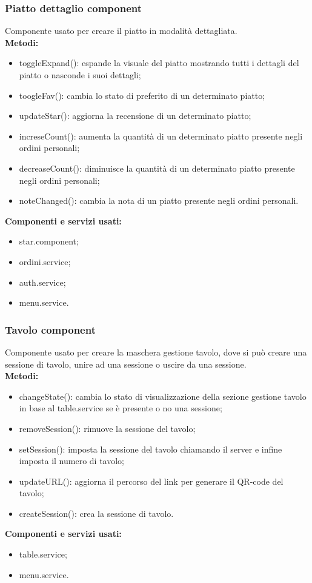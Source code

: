 \subsubsection{Piatto dettaglio component}
Componente usato per creare il piatto in modalità dettagliata.\\
\textbf{Metodi:}
\begin{itemize}
    \item toggleExpand(): espande la visuale del piatto mostrando tutti i dettagli del piatto o nasconde i suoi dettagli;
    \item toogleFav(): cambia lo stato di preferito di un determinato piatto;
    \item updateStar(): aggiorna la recensione di un determinato piatto;
    \item increseCount(): aumenta la quantità di un determinato piatto presente negli ordini personali;
    \item decreaseCount(): diminuisce la quantità di un determinato piatto presente negli ordini personali;
    \item noteChanged(): cambia la nota di un piatto presente negli ordini personali.
\end{itemize}
\textbf{Componenti e servizi usati:}
\begin{itemize}
    \item star.component;
    \item ordini.service;
    \item auth.service;
    \item menu.service.
\end{itemize}

\subsubsection{Tavolo component}
Componente usato per creare la maschera gestione tavolo, dove si può creare una sessione di tavolo, unire ad una sessione o uscire da una sessione.\\
\textbf{Metodi:}
\begin{itemize}
    \item changeState(): cambia lo stato di visualizzazione della sezione gestione tavolo in base al table.service se è presente o no una sessione;
    \item removeSession(): rimuove la sessione del tavolo;
    \item setSession(): imposta la sessione del tavolo chiamando il server e infine imposta il numero di tavolo;
    \item updateURL(): aggiorna il percorso del link per generare il QR-code del tavolo;
    \item createSession(): crea la sessione di tavolo.
\end{itemize}
\textbf{Componenti e servizi usati:}
\begin{itemize}
    \item table.service;
    \item menu.service.
\end{itemize}

